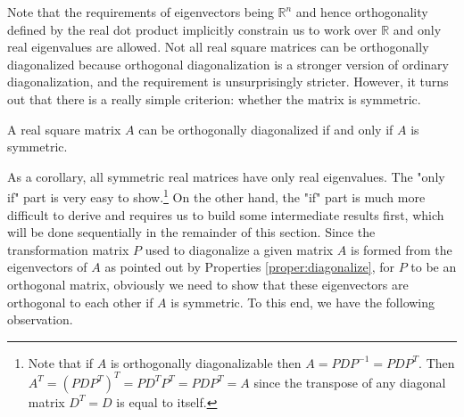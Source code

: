 Note that the requirements of eigenvectors being $\mathbb{R}^n$ and hence orthogonality defined by the real dot product implicitly constrain us to work over $\mathbb{R}$ and only real eigenvalues are allowed. Not all real square matrices can be orthogonally diagonalized because orthogonal diagonalization is a stronger version of ordinary diagonalization, and the requirement is unsurprisingly stricter. However, it turns out that there is a really simple criterion: whether the matrix is symmetric.
\begin{thm}
\label{thm:symdiag}
A real square matrix $A$ can be orthogonally diagonalized if and only if $A$ is symmetric.
\end{thm}
As a corollary, all symmetric real matrices have only real eigenvalues. The "only if" part is very easy to show.\footnote{Note that if $A$ is orthogonally diagonalizable then $A = PDP^{-1} = PDP^T$. Then $A^T = (PDP^T)^T = PD^TP^T = PDP^T = A$ since the transpose of any diagonal matrix $D^T = D$ is equal to itself.} On the other hand, the "if" part is much more difficult to derive and requires us to build some intermediate results first, which will be done sequentially in the remainder of this section. Since the transformation matrix $P$ used to diagonalize a given matrix $A$ is formed from the eigenvectors of $A$ as pointed out by Properties \ref{proper:diagonalize}, for $P$ to be an orthogonal matrix, obviously we need to show that these eigenvectors are orthogonal to each other if $A$ is symmetric. To this end, we have the following observation.
